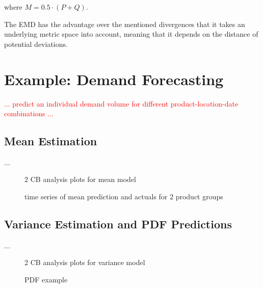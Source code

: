 \documentclass[BCOR=1mm, DIV=calc,10pt,
twoside=true,
twocolumn,
headings=normal]{scrartcl}
\begin{document}
where $M = 0.5  \cdot (P + Q)$.

The EMD has the advantage over the mentioned divergences that it takes an underlying metric space into account, meaning that it depends on the distance of potential deviations.


\section{Example: Demand Forecasting}
\label{sec:example}

\textcolor{red}{... predict an individual demand volume for different product-location-date combinations ...}

\subsection{Mean Estimation}

...

\begin{figure}
\begin{center}
\caption{\label{fig:cb_mean} 2 CB analysis plots for mean model}
\end{center}
\end{figure}

\begin{figure}
\begin{center}
\caption{\label{fig:mean_prediction} time series of mean prediction and actuals for 2 product groups}
\end{center}
\end{figure}

\subsection{Variance Estimation and PDF Predictions}

...

\begin{figure}
\begin{center}
\caption{\label{fig:cb_var} 2 CB analysis plots for variance model}
\end{center}
\end{figure}

\begin{figure}
\begin{center}
\caption{\label{fig:pdf_example} PDF example}
\end{center}
\end{figure}
\end{document}
